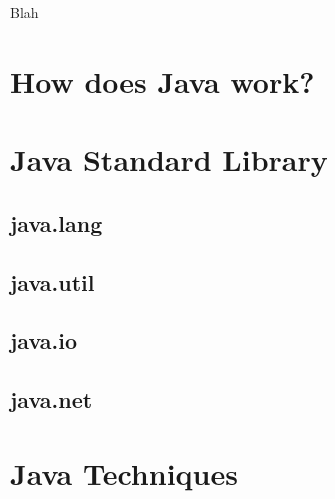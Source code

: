 Blah \\


\toclineskip
\section{How does Java work?}


\toclineskip
\section{Java Standard Library}


\subsection{java.lang}


\subsection{java.util}


\subsection{java.io}


\subsection{java.net}


\toclineskip
\section{Java Techniques}

